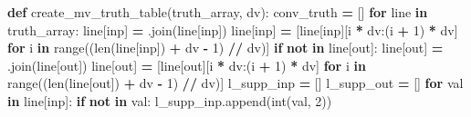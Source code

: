 \documentclass[
  italian,
]{book}
\newenvironment{Shaded}{\begin{snugshade}}{\end{snugshade}}
\newcommand{\BuiltInTok}[1]{#1}
\newcommand{\ControlFlowTok}[1]{\textcolor[rgb]{0.13,0.29,0.53}{\textbf{#1}}}
\newcommand{\DecValTok}[1]{\textcolor[rgb]{0.00,0.00,0.81}{#1}}
\newcommand{\KeywordTok}[1]{\textcolor[rgb]{0.13,0.29,0.53}{\textbf{#1}}}
\newcommand{\NormalTok}[1]{#1}
\newcommand{\OperatorTok}[1]{\textcolor[rgb]{0.81,0.36,0.00}{\textbf{#1}}}
\newcommand{\StringTok}[1]{\textcolor[rgb]{0.31,0.60,0.02}{#1}}
\begin{document}
\begin{Shaded}
\begin{Highlighting}[]
\KeywordTok{def}\NormalTok{ create\_mv\_truth\_table(truth\_array, dv):}
\NormalTok{  conv\_truth }\OperatorTok{=}\NormalTok{ []}
  \ControlFlowTok{for}\NormalTok{ line }\KeywordTok{in}\NormalTok{ truth\_array:}
\NormalTok{    line[}\StringTok{\textquotesingle{}inp\textquotesingle{}}\NormalTok{] }\OperatorTok{=} \StringTok{\textquotesingle{}\textquotesingle{}}\NormalTok{.join(line[}\StringTok{\textquotesingle{}inp\textquotesingle{}}\NormalTok{])}
\NormalTok{    line[}\StringTok{\textquotesingle{}inp\textquotesingle{}}\NormalTok{] }\OperatorTok{=}\NormalTok{ [line[}\StringTok{\textquotesingle{}inp\textquotesingle{}}\NormalTok{][i }\OperatorTok{*}\NormalTok{ dv:(i }\OperatorTok{+} \DecValTok{1}\NormalTok{) }\OperatorTok{*}\NormalTok{ dv]}
      \ControlFlowTok{for}\NormalTok{ i }\KeywordTok{in} \BuiltInTok{range}\NormalTok{((}\BuiltInTok{len}\NormalTok{(line[}\StringTok{\textquotesingle{}inp\textquotesingle{}}\NormalTok{]) }\OperatorTok{+}\NormalTok{ dv }\OperatorTok{{-}} \DecValTok{1}\NormalTok{) }\OperatorTok{//}\NormalTok{ dv)]}
    \ControlFlowTok{if} \StringTok{\textquotesingle{}{-}\textquotesingle{}} \KeywordTok{not} \KeywordTok{in}\NormalTok{ line[}\StringTok{\textquotesingle{}out\textquotesingle{}}\NormalTok{]:}
\NormalTok{      line[}\StringTok{\textquotesingle{}out\textquotesingle{}}\NormalTok{] }\OperatorTok{=} \StringTok{\textquotesingle{}\textquotesingle{}}\NormalTok{.join(line[}\StringTok{\textquotesingle{}out\textquotesingle{}}\NormalTok{])}
\NormalTok{      line[}\StringTok{\textquotesingle{}out\textquotesingle{}}\NormalTok{] }\OperatorTok{=}\NormalTok{ [line[}\StringTok{\textquotesingle{}out\textquotesingle{}}\NormalTok{][i }\OperatorTok{*}\NormalTok{ dv:(i }\OperatorTok{+} \DecValTok{1}\NormalTok{) }\OperatorTok{*}\NormalTok{ dv]}
        \ControlFlowTok{for}\NormalTok{ i }\KeywordTok{in} \BuiltInTok{range}\NormalTok{((}\BuiltInTok{len}\NormalTok{(line[}\StringTok{\textquotesingle{}out\textquotesingle{}}\NormalTok{]) }\OperatorTok{+}\NormalTok{ dv }\OperatorTok{{-}} \DecValTok{1}\NormalTok{) }\OperatorTok{//}\NormalTok{ dv)]}
\NormalTok{      l\_supp\_inp }\OperatorTok{=}\NormalTok{ []}
\NormalTok{      l\_supp\_out }\OperatorTok{=}\NormalTok{ []}
      \ControlFlowTok{for}\NormalTok{ val }\KeywordTok{in}\NormalTok{ line[}\StringTok{\textquotesingle{}inp\textquotesingle{}}\NormalTok{]:}
        \ControlFlowTok{if} \StringTok{\textquotesingle{}{-}\textquotesingle{}} \KeywordTok{not} \KeywordTok{in}\NormalTok{ val:}
\NormalTok{          l\_supp\_inp.append(}\BuiltInTok{int}\NormalTok{(val, }\DecValTok{2}\NormalTok{))}

\end{Highlighting}
\end{Shaded}
\end{document}
